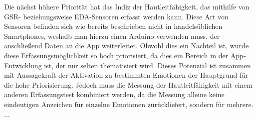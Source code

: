 \newline
Die nächst höhere Priorität hat das Indiz der Hautleitfähigkeit, das mithilfe von GSR- beziehungsweise EDA-Sensoren erfasst werden kann. Diese Art von Sensoren befinden sich wie bereits beschrieben nicht in handelsüblichen Smartphones, weshalb man hierzu einen Arduino verwenden muss, der anschließend Daten an die App weiterleitet. Obwohl dies ein Nachteil ist, wurde diese Erfassungsmöglichkeit so hoch priorisiert, da dies ein Bereich in der App-Entwicklung ist, der nur selten thematisiert wird. Dieses Potenzial ist zusammen mit Aussagekraft der Aktivation zu bestimmten Emotionen der Hauptgrund für die hohe Priorisierung. Jedoch muss die Messung der Hautleitfähigkeit mit einem anderen Erfassungstest kombiniert werden, da die Messung alleine keine eindeutigen Anzeichen für einzelne Emotionen zurückliefert, sondern für mehrere.\newline
...
